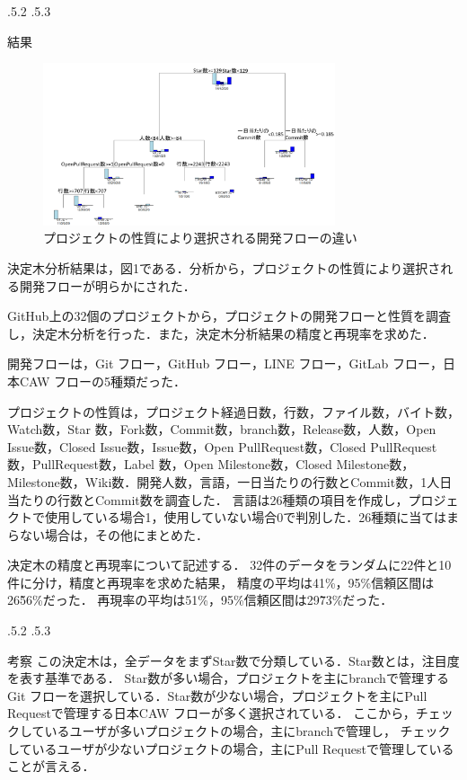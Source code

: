 \documentclass[uplatex,twocolumn]{jsarticle}
\makeatletter
\renewcommand{\section}{%
    \if@slide\clearpage\fi
    \@startsection{section}{1}{\z@}%
    {\Cvs \@plus.5\Cdp \@minus.2\Cdp}%
    {.5\Cvs \@plus.3\Cdp}%
    {\normalfont\raggedright}}
\makeatother
\begin{document}
\section{結果}

\begin{figure}[H]
\includegraphics[width=8.6cm,clip]{decisiontree.png}
\caption{プロジェクトの性質により選択される開発フローの違い}\label{決定木}
\end{figure}

決定木分析結果は，図1である．分析から，プロジェクトの性質により選択される開発フローが明らかにされた．


GitHub上の32個のプロジェクトから，プロジェクトの開発フローと性質を調査し，決定木分析を行った．また，決定木分析結果の精度と再現率を求めた．

開発フローは，Git フロー，GitHub フロー，LINE フロー，GitLab フロー，日本CAW フローの5種類だった．

プロジェクトの性質は，プロジェクト経過日数，行数，ファイル数，バイト数，Watch数，Star 数，Fork数，Commit数，branch数，Release数，人数，Open Issue数，Closed Issue数，Issue数，Open PullRequest数，Closed PullRequest数，PullRequest数，Label 数，Open Milestone数，Closed Milestone数，Milestone数，Wiki数．開発人数，言語，一日当たりの行数とCommit数，1人日当たりの行数とCommit数を調査した．
言語は26種類の項目を作成し，プロジェクトで使用している場合1，使用していない場合0で判別した．26種類に当てはまらない場合は，その他にまとめた．


决定木の精度と再現率について記述する．
32件のデータをランダムに22件と10件に分け，精度と再現率を求めた結果，
精度の平均は41\%，95\%信頼区間は26\~56\%だった．
再現率の平均は51\%，95\%信頼区間は29\~73\%だった．


\section{考察}
この決定木は，全データをまずStar数で分類している．Star数とは，注目度を表す基準である．
Star数が多い場合，プロジェクトを主にbranchで管理するGit フローを選択している．Star数が少ない場合，プロジェクトを主にPull Requestで管理する日本CAW フローが多く選択されている．
ここから，チェックしているユーザが多いプロジェクトの場合，主にbranchで管理し，
チェックしているユーザが少ないプロジェクトの場合，主にPull Requestで管理していることが言える．
\end{document}
